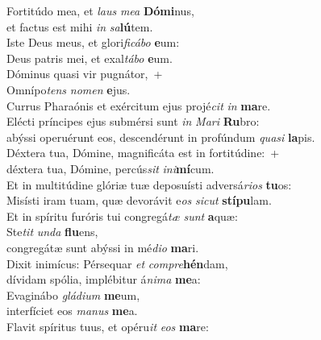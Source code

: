 \evenverse Fortitúdo mea, et \textit{laus} \textit{me}\textit{a} \textbf{Dó}\textbf{mi}nus,~\*\\
\evenverse et factus est mihi \textit{in} \textit{sa}\textbf{lú}tem.\\
\oddverse Iste Deus meus, et glori\textit{fi}\textit{cá}\textit{bo} \textbf{e}um:~\*\\
\oddverse Deus patris mei, et exal\textit{tá}\textit{bo} \textbf{e}um.\\
\evenverse Dóminus quasi vir pugnátor,~+\\
\evenverse  Omnípo\textit{tens} \textit{no}\textit{men} \textbf{e}jus.~\*\\
\evenverse Currus Pharaónis et exércitum ejus projé\textit{cit} \textit{in} \textbf{ma}re.\\
\oddverse Elécti príncipes ejus submérsi sunt \textit{in} \textit{Ma}\textit{ri} \textbf{Ru}bro:~\*\\
\oddverse abýssi operuérunt eos, descendérunt in profúndum \textit{qua}\textit{si} \textbf{la}pis.\\
\evenverse Déxtera tua, Dómine, magnificáta est in fortitúdine:~+\\
\evenverse  déxtera tua, Dómine, percús\textit{sit} \textit{i}\textit{ni}\textbf{mí}cum.~\*\\
\evenverse Et in multitúdine glóriæ tuæ deposuísti adversá\textit{ri}\textit{os} \textbf{tu}os:\\
\oddverse Misísti iram tuam, quæ devorávit e\textit{os} \textit{si}\textit{cut} \textbf{stí}\textbf{pu}lam.~\*\\
\oddverse Et in spíritu furóris tui congregá\textit{tæ} \textit{sunt} \textbf{a}quæ:\\
\evenverse Ste\textit{tit} \textit{un}\textit{da} \textbf{flu}ens,~\*\\
\evenverse congregátæ sunt abýssi in mé\textit{di}\textit{o} \textbf{ma}ri.\\
\oddverse Dixit inimícus: Pérsequar \textit{et} \textit{com}\textit{pre}\textbf{hén}dam,~\*\\
\oddverse dívidam spólia, implébitur á\textit{ni}\textit{ma} \textbf{me}a:\\
\evenverse Evaginábo \textit{glá}\textit{di}\textit{um} \textbf{me}um,~\*\\
\evenverse interfíciet eos \textit{ma}\textit{nus} \textbf{me}a.\\
\oddverse Flavit spíritus tuus, et opéru\textit{it} \textit{e}\textit{os} \textbf{ma}re:~\*\\
